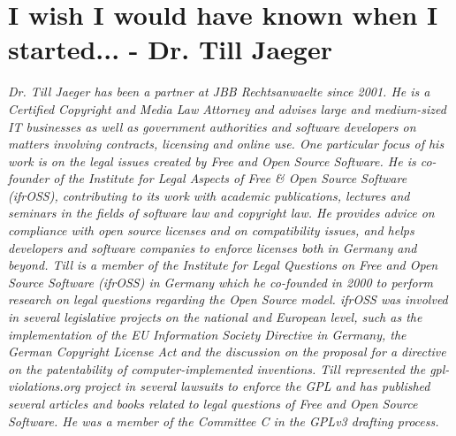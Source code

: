 \chapter{I wish I would have known when I started... - Dr. Till Jaeger} 

\textit{Dr. Till Jaeger has been a partner at JBB Rechtsanwaelte since 2001. He is a Certified Copyright and Media Law Attorney and advises large and medium-sized IT businesses as well as government authorities and software developers on matters involving contracts, licensing and online use. One particular focus of his work is on the legal issues created by Free and Open Source Software. He is co-founder of the Institute for Legal Aspects of Free \& Open Source Software (ifrOSS), contributing to its work with academic publications, lectures and seminars in the fields of software law and copyright law. He provides advice on compliance with open source licenses and on compatibility issues, and helps developers and software companies to enforce licenses both in Germany and beyond.
\newline
Till is a member of the Institute for Legal Questions on Free and Open Source Software (ifrOSS) in Germany which he co-founded in 2000 to perform research on legal questions regarding the Open Source model. ifrOSS was involved in several legislative projects on the national and European level, such as the implementation of the EU Information Society Directive in Germany, the German Copyright License Act and the discussion on the proposal for a directive on the patentability of computer-implemented inventions.
\newline
Till represented the gpl-violations.org project in several lawsuits to enforce the GPL and has published several articles and books related to legal questions of Free and Open Source Software. He was a member of the Committee C in the GPLv3 drafting process.}

